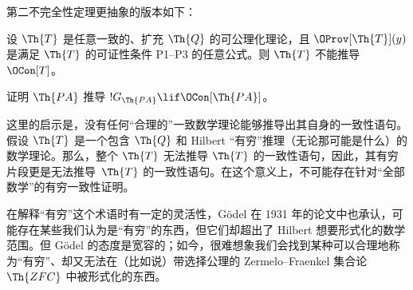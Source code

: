\documentclass[../../../include/open-logic-section]{subfiles}
\begin{document}
第二不完全性定理更抽象的版本如下：

\begin{thm}
 设 $\Th{T}$ 是任意一致的、扩充 $\Th{Q}$ 的可公理化理论，且 $\OProv[\Th{T}](y)$ 是满足 $\Th{T}$ 的可证性条件 P1--P3 的任意公式。则 $\Th{T}$ 不能推导~$\OCon[T]$。
\end{thm}

\begin{prob}
证明 $\Th{PA}$ 推导 $!G_{\Th{PA}} \lif \OCon[\Th{PA}]$。
\end{prob}

\begin{digress}
这里的启示是，没有任何“合理的”一致数学理论能够推导出其自身的一致性语句。假设 $\Th{T}$ 是一个包含 $\Th{Q}$ 和 Hilbert “有穷”推理（无论那可能是什么）的数学理论。那么，整个 $\Th{T}$ 无法推导 $\Th{T}$ 的一致性语句，因此，其有穷片段更是无法推导~$\Th{T}$ 的一致性语句。在这个意义上，不可能存在针对“全部数学”的有穷一致性证明。

在解释“有穷”这个术语时有一定的灵活性，Gödel 在 1931 年的论文中也承认，可能存在某些我们认为是“有穷”的东西，但它们却超出了 Hilbert 想要形式化的数学范围。但 Gödel 的态度是宽容的；如今，很难想象我们会找到某种可以合理地称为“有穷”、却又无法在（比如说）带选择公理的 Zermelo--Fraenkel 集合论 $\Th{ZFC}$ 中被形式化的东西。
\end{digress}
\end{document}
